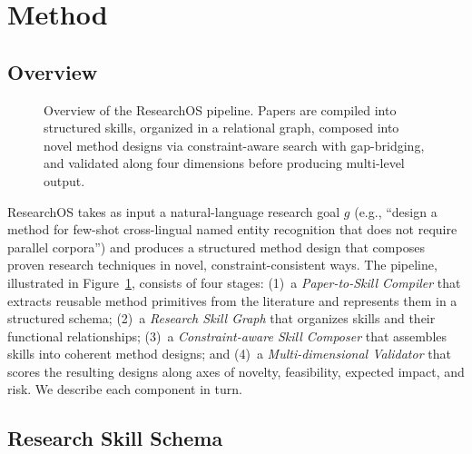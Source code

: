 \section{Method}
\label{sec:method}

\subsection{Overview}
\label{sec:method_overview}

\begin{figure}[t]
\centering
{}
\caption{Overview of the ResearchOS pipeline. Papers are compiled into structured skills, organized in a relational graph, composed into novel method designs via constraint-aware search with gap-bridging, and validated along four dimensions before producing multi-level output.}
\label{fig:pipeline}
\end{figure}

ResearchOS takes as input a natural-language research goal $g$ (e.g., ``design a method for few-shot cross-lingual named entity recognition that does not require parallel corpora'') and produces a structured method design that composes proven research techniques in novel, constraint-consistent ways. The pipeline, illustrated in Figure~\ref{fig:pipeline}, consists of four stages: (1)~a \emph{Paper-to-Skill Compiler} that extracts reusable method primitives from the literature and represents them in a structured schema; (2)~a \emph{Research Skill Graph} that organizes skills and their functional relationships; (3)~a \emph{Constraint-aware Skill Composer} that assembles skills into coherent method designs; and (4)~a \emph{Multi-dimensional Validator} that scores the resulting designs along axes of novelty, feasibility, expected impact, and risk. We describe each component in turn.

\subsection{Research Skill Schema}
\label{sec:skill_schema}

